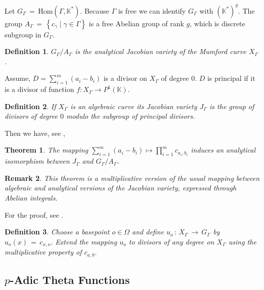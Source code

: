 \documentclass[]{amsart}
\numberwithin{equation}{section}
\newtheorem{theorem}{Theorem}[section]
\newtheorem{definition}{Definition}[section]
\newtheorem{remark}[theorem]{Remark}
\newcommand{\Hom}{\mathrm{Hom}}
\begin{document}
Let $G_{\Gamma} \,{=}\,\Hom(\Gamma,\mathbb{K}^{\ast})$. 
Because $\Gamma$ is free we can identify $G_{\Gamma}$ with $\left({\mathbb{K}^{\ast}}\right)^{g}$. 
The group $A_{\Gamma} \,{=}\, \left\{c_{\gamma} \mid \gamma\in \Gamma\right\}$ 
is a free Abelian group of rank $g$, which is discrete subgroup in $G_{\Gamma}$. 
\begin{definition}
$G_{\Gamma}/A_{\Gamma}$ is the analytical Jacobian variety of the Mumford curve $X_{\Gamma}$. 
\end{definition}
Assume, $D=\sum_{i=1}^m (a_i-b_i)$ is a divisor on $X_{\Gamma}$ of degree $0.$ $D$ is principal 
if it is a divisor of function $f:X_{\Gamma}\to P^1(\mathbb{K})$.
\begin{definition}
If $X_{\Gamma}$ is an algebraic curve its Jacobian variety $J_{\Gamma}$ 
is the group of divisors of degree $0$ modulo the subgroup of principal divisors. 
\end{definition}


Then we have, see  \cite{GV},
\begin{theorem}
The mapping $\sum_{i=1}^m (a_i-b_i)\mapsto \prod_{i=1}^m c_{a_i,b_i}$ induces an analytical isomorphism 
 between $J_{\Gamma}$ and $G_{\Gamma}/A_{\Gamma}$. 
\end{theorem}
\begin{remark}
This theorem is a multiplicative version of the usual mapping 
between algebraic and analytical  versions of the Jacobian variety, expressed  through Abelian integrals.  
\end{remark}
For the proof, see \cite{GV}.
\begin{definition}
Choose a basepoint $o \in \Omega$ and define  
$u_{o}\,{:}\,X_{\Gamma} \,{\to}\, G_{\Gamma}$ by $u_{o}(x)\,{=}\,c_{x,o}$. 
Extend the mapping $u_{o}$ to divisors of any degree on 
$X_{\Gamma}$ using the multiplicative property of $c_{a,b}$.
\end{definition}

\subsection{$p$-Adic Theta Functions}
\end{document}
